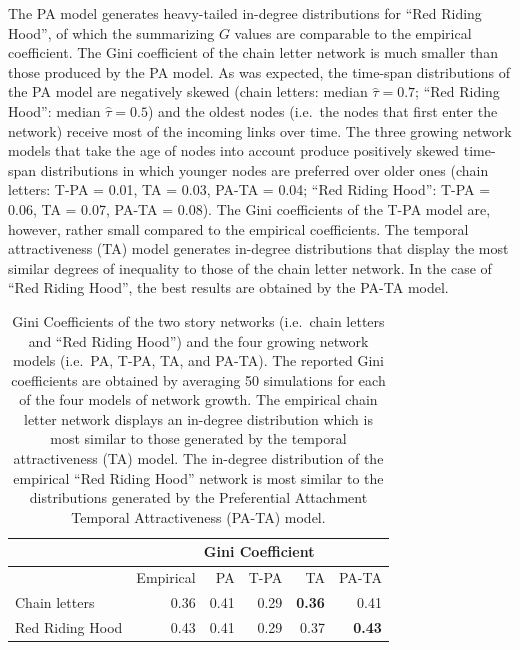 The PA model generates heavy-tailed in-degree distributions for ``Red Riding Hood'', of which the summarizing $G$ values are comparable to the empirical coefficient. The Gini coefficient of the chain letter network is much smaller than those produced by the PA model. As was expected, the time-span distributions of the PA model are negatively skewed (chain letters: median $\hat{\tau}= 0.7$; ``Red Riding Hood'': median $\hat{\tau}=0.5$) and the oldest nodes (i.e.\ the nodes that first enter the network) receive most of the incoming links over time. The three growing network models that take the age of nodes into account produce positively skewed time-span distributions in which younger nodes are preferred over older ones (chain letters: T-PA = 0.01, TA = 0.03, PA-TA = 0.04; ``Red Riding Hood'': T-PA = 0.06, TA = 0.07, PA-TA = 0.08). The Gini coefficients of the T-PA model are, however, rather small compared to the empirical coefficients. The temporal attractiveness (TA) model generates in-degree distributions that display the most similar degrees of inequality to those of the chain letter network. In the case of ``Red Riding Hood'', the best results are obtained by the PA-TA model.

\begin{table}
  \centering
  \begin{tabular}{lrrrrr}
  \toprule
                    & \multicolumn{5}{c}{Gini Coefficient}   \\ \midrule
                    & Empirical & PA   & T-PA & TA   & PA-TA \\ \cmidrule(r){2-6}
    Chain letters   & 0.36      & 0.41 & 0.29 & {\bf 0.36} & 0.41  \\
    Red Riding Hood & 0.43      & 0.41 & 0.29 & 0.37 & {\bf 0.43}  \\
  \bottomrule
  \end{tabular}
  \caption{Gini Coefficients of the two story networks (i.e.\ chain letters and ``Red Riding Hood'') and the four growing network models (i.e.\ PA, T-PA, TA, and PA-TA). The reported Gini coefficients are obtained by averaging 50 simulations for each of the four models of network growth. The empirical chain letter network displays an in-degree distribution which is most similar to those generated by the temporal attractiveness (TA) model. The in-degree distribution of the empirical ``Red Riding Hood'' network is most similar to the distributions generated by the Preferential Attachment Temporal Attractiveness (PA-TA) model.}
  \label{tab:gini-comparison}
\end{table}

